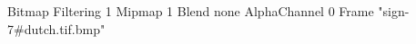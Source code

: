 {Bitmap
	{Filtering 1}
	{Mipmap 1}
	{Blend none}
	{AlphaChannel 0}
	{Frame "sign-7#dutch.tif.bmp"}
}
